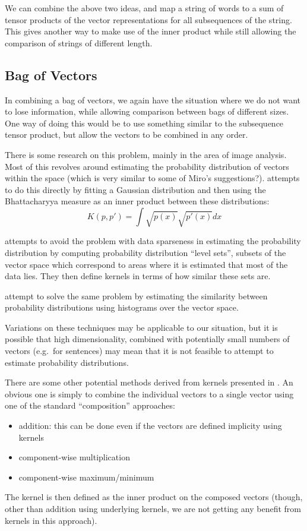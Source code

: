 \documentclass{article}
\begin{document}
We can combine the above two ideas, and map a string of words to a sum
of tensor products of the vector representations for all subsequences
of the string. This gives another way to make use of the inner product
while still allowing the comparison of strings of different length.

\subsection{Bag of Vectors}

In combining a bag of vectors, we again have the situation where we
do not want to lose information, while allowing comparison between
bags of different sizes. One way of doing this would be to use
something similar to the subsequence tensor product, but allow the
vectors to be combined in any order.

There is some research on this problem, mainly in the area of image
analysis. Most of this revolves around estimating the probability
distribution of vectors within the space (which is very similar to
some of Miro's suggestions?). \citet{kondor2003kernel} attempts to
do this directly by fitting a Gaussian distribution and then using the
Bhattacharyya measure as an inner product between these distributions:
$$K(p,p') = \int \sqrt{p(x)}\sqrt{p'(x)}dx$$

\citet{desobry2005class} attempts to avoid the problem with data
sparseness in estimating the probability distribution by computing
probability distribution ``level sets'', subsets of the vector space
which correspond to areas where it is estimated that most of the data
lies. They then define kernels in terms of how similar these sets
are.

\citet{grauman2005pyramid} attempt to solve the same problem by
estimating the similarity between probability distributions using
histograms over the vector space.

Variations on these techniques may be applicable to our situation, but
it is possible that high dimensionality, combined with potentially
small numbers of vectors (e.g.~for sentences) may mean that it is not
feasible to attempt to estimate probability distributions.

There are some other potential methods derived from kernels presented
in \citet{shawe2004kernel}. An obvious one is simply to combine the
individual vectors to a single vector using one of the standard
``composition'' approaches:
\begin{itemize}
\item addition: this can be done even if the vectors are defined
  implicity using kernels
\item component-wise multiplication
\item component-wise maximum/minimum
\end{itemize}
The kernel is then defined as the inner product on the composed
vectors (though, other than addition using underlying kernels, we are
not getting any benefit from kernels in this approach).
\end{document}
